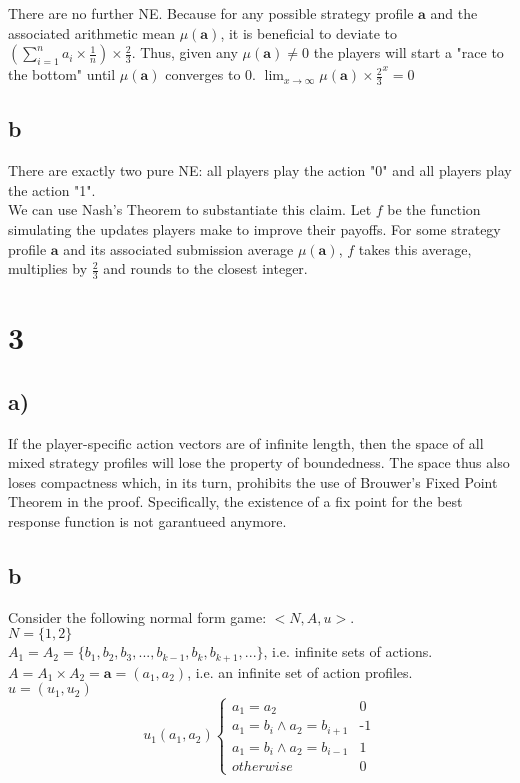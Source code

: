 \documentclass[10pt,a4paper]{article}
\begin{document}
There are no further NE. Because for any possible strategy profile $\textbf{a}$ and the associated arithmetic mean $\mu(\textbf{a})$, it is beneficial to deviate to $(\sum^n_{i=1} a_i \times \tfrac{1}{n})\times \tfrac{2}{3}$. Thus, given any $\mu(\textbf{a})\neq 0$ the players will start a "race to the bottom" until $\mu(\textbf{a})$ converges to $0$. $\lim_{x\rightarrow \infty} \mu(\textbf{a})\times \tfrac{2}{3}^x=0$
\subsection*{b}
There are exactly two pure NE: all players play the action "0" and all players play the action "1". \\
We can use Nash's Theorem to substantiate this claim. Let $f$ be the function simulating the updates players make to improve their payoffs. For some strategy profile $\textbf{a}$ and its associated submission average $\mu(\textbf{a})$, $f$ takes this average, multiplies by $\tfrac{2}{3}$ and rounds to the closest integer.

\section*{3}
\subsection*{a)}
If the player-specific action vectors are of infinite length, then the space of all mixed strategy profiles will lose the property of boundedness. The space thus also loses compactness which, in its turn, prohibits the use of Brouwer's Fixed Point Theorem in the proof. Specifically, the existence of a fix point for the best response function is not garantueed anymore.

\subsection*{b}
Consider the following normal form game: $<N,A,u>$.\\
$N=\{1,2\}$\\
$A_1=A_2=\{b_1,b_2,b_3,...,b_{k-1},b_{k},b_{k+1},...\}$, i.e. infinite sets of actions.
$A=A_1\times A_2=\textbf{a}=(a_1,a_2)$, i.e. an infinite set of action profiles.\\
$u=(u_1,u_2)$\\
\begin{equation*}
u_1(a_1,a_2) \begin{cases}
a_1=a_2 & \text{0}\\
a_1=b_i \land a_2=b_{i+1} & \text{-1}\\
a_1=b_i \land a_2=b_{i-1} & \text{1}\\
otherwise & \text{0}
\end{cases}
\end{equation*}
\end{document}
